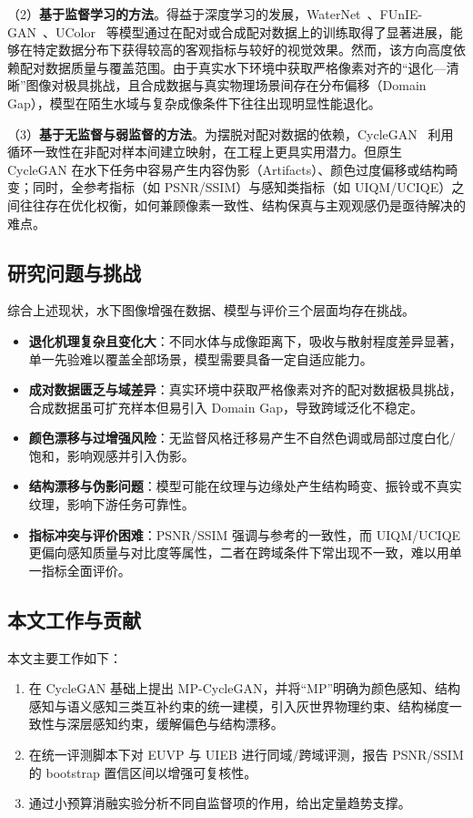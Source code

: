 \documentclass[a4paper,zihao=-4,linespread=1.25]{ctexart}
\begin{document}
（2）\textbf{基于监督学习的方法}。得益于深度学习的发展，WaterNet~\cite{1}、FUnIE-GAN~\cite{2}、UColor~\cite{3} 等模型通过在配对或合成配对数据上的训练取得了显著进展，能够在特定数据分布下获得较高的客观指标与较好的视觉效果。然而，该方向高度依赖配对数据质量与覆盖范围。由于真实水下环境中获取严格像素对齐的“退化—清晰”图像对极具挑战，且合成数据与真实物理场景间存在分布偏移（Domain Gap），模型在陌生水域与复杂成像条件下往往出现明显性能退化。

（3）\textbf{基于无监督与弱监督的方法}。为摆脱对配对数据的依赖，CycleGAN~\cite{4} 利用循环一致性在非配对样本间建立映射，在工程上更具实用潜力。但原生 CycleGAN 在水下任务中容易产生内容伪影（Artifacts）、颜色过度偏移或结构畸变；同时，全参考指标（如 PSNR/SSIM）与感知类指标（如 UIQM/UCIQE）之间往往存在优化权衡，如何兼顾像素一致性、结构保真与主观观感仍是亟待解决的难点。

\subsection{研究问题与挑战}
综合上述现状，水下图像增强在数据、模型与评价三个层面均存在挑战。
\begin{itemize}
    \item \textbf{退化机理复杂且变化大}：不同水体与成像距离下，吸收与散射程度差异显著，单一先验难以覆盖全部场景，模型需要具备一定自适应能力。
    \item \textbf{成对数据匮乏与域差异}：真实环境中获取严格像素对齐的配对数据极具挑战，合成数据虽可扩充样本但易引入 Domain Gap，导致跨域泛化不稳定。
    \item \textbf{颜色漂移与过增强风险}：无监督风格迁移易产生不自然色调或局部过度白化/饱和，影响观感并引入伪影。
    \item \textbf{结构漂移与伪影问题}：模型可能在纹理与边缘处产生结构畸变、振铃或不真实纹理，影响下游任务可靠性。
    \item \textbf{指标冲突与评价困难}：PSNR/SSIM 强调与参考的一致性，而 UIQM/UCIQE 更偏向感知质量与对比度等属性，二者在跨域条件下常出现不一致，难以用单一指标全面评价。
\end{itemize}

\subsection{本文工作与贡献}
本文主要工作如下：
\begin{enumerate}
    \item 在 CycleGAN 基础上提出 MP-CycleGAN，并将“MP”明确为颜色感知、结构感知与语义感知三类互补约束的统一建模，引入灰世界物理约束、结构梯度一致性与深层感知约束，缓解偏色与结构漂移。
    \item 在统一评测脚本下对 EUVP 与 UIEB 进行同域/跨域评测，报告 PSNR/SSIM 的 bootstrap 置信区间以增强可复核性。
    \item 通过小预算消融实验分析不同自监督项的作用，给出定量趋势支撑。
\end{enumerate}
\end{document}
